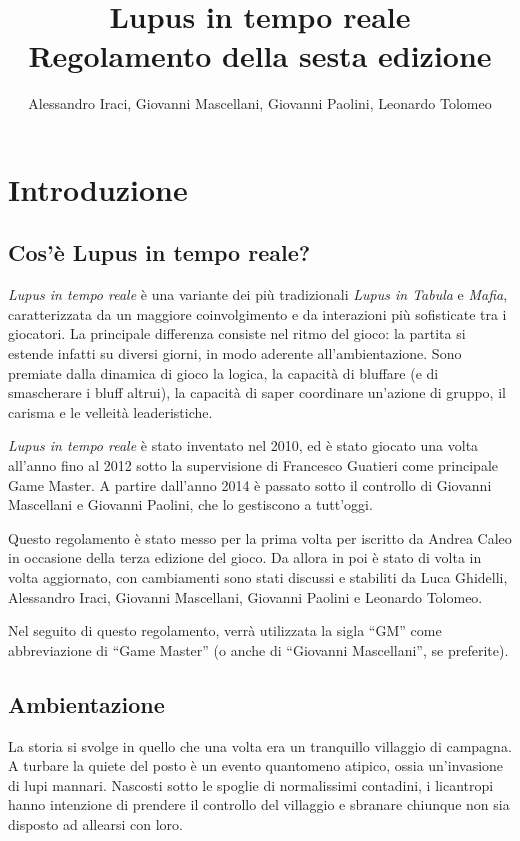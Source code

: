 \documentclass[a4paper,10pt]{article}
\title{Lupus in tempo reale\\ Regolamento della sesta edizione}
\author{Alessandro Iraci, Giovanni Mascellani, Giovanni Paolini, Leonardo Tolomeo}
\begin{document}
\maketitle


\section{Introduzione}

\subsection{Cos'è Lupus in tempo reale?}

\emph{Lupus in tempo reale} è una variante dei più tradizionali \emph{Lupus in Tabula} e \emph{Mafia}, caratterizzata da un maggiore coinvolgimento e da interazioni più sofisticate tra i giocatori.
La principale differenza consiste nel ritmo del gioco: la partita si estende infatti su diversi giorni, in modo aderente all'ambientazione.
Sono premiate dalla dinamica di gioco la logica, la capacità di bluffare (e di smascherare i bluff altrui), la capacità di saper coordinare un’azione di gruppo, il carisma e le velleità leaderistiche.

\emph{Lupus in tempo reale} è stato inventato nel 2010, ed è stato giocato una volta all'anno fino al 2012 sotto la supervisione di Francesco Guatieri come principale Game Master. A partire dall'anno 2014 è passato sotto il controllo di Giovanni Mascellani e Giovanni Paolini, che lo gestiscono a tutt'oggi.

Questo regolamento è stato messo per la prima volta per iscritto da Andrea Caleo in occasione della terza edizione del gioco. Da allora in poi è stato di volta in volta aggiornato, con cambiamenti sono stati discussi e stabiliti da Luca Ghidelli, Alessandro Iraci, Giovanni Mascellani, Giovanni Paolini e Leonardo Tolomeo.

Nel seguito di questo regolamento, verrà utilizzata la sigla ``GM'' come abbreviazione di ``Game Master'' (o anche di ``Giovanni Mascellani'', se preferite).

\subsection{Ambientazione}

La storia si svolge in quello che una volta era un tranquillo villaggio di campagna. A turbare la quiete del posto è un evento quantomeno atipico, ossia un'invasione di lupi mannari. Nascosti sotto le spoglie di normalissimi contadini, i licantropi hanno intenzione di prendere il controllo del villaggio e sbranare chiunque non sia disposto ad allearsi con loro.
\end{document}
